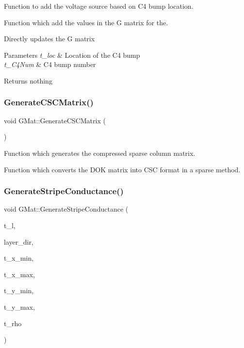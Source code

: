 Function to add the voltage source based on C4 bump location. 

Function which add the values in the G matrix for the.

Directly updates the G matrix 
\begin{DoxyParams}{Parameters}
{\em t\+\_\+loc} & Location of the C4 bump \\
\hline
{\em t\+\_\+\+C4\+Num} & C4 bump number \\
\hline
\end{DoxyParams}
\begin{DoxyReturn}{Returns}
nothing 
\end{DoxyReturn}
\mbox{\label{classGMat_acc6b68783732ff34b6dd4098cb738836}} 
\subsubsection{\texorpdfstring{Generate\+C\+S\+C\+Matrix()}{GenerateCSCMatrix()}}
{\footnotesize\ttfamily void G\+Mat\+::\+Generate\+C\+S\+C\+Matrix (\begin{DoxyParamCaption}{ }\end{DoxyParamCaption})}



Function which generates the compressed sparse column matrix. 

Function which converts the D\+OK matrix into C\+SC format in a sparse method. \mbox{\label{classGMat_a0d8697945b060deaaf4bbd3a444aab6f}} 
\subsubsection{\texorpdfstring{Generate\+Stripe\+Conductance()}{GenerateStripeConductance()}}
{\footnotesize\ttfamily void G\+Mat\+::\+Generate\+Stripe\+Conductance (\begin{DoxyParamCaption}\item[{int}]{t\+\_\+l,  }\item[{odb\+::db\+Tech\+Layer\+Dir\+::\+Value}]{layer\+\_\+dir,  }\item[{int}]{t\+\_\+x\+\_\+min,  }\item[{int}]{t\+\_\+x\+\_\+max,  }\item[{int}]{t\+\_\+y\+\_\+min,  }\item[{int}]{t\+\_\+y\+\_\+max,  }\item[{double}]{t\+\_\+rho }\end{DoxyParamCaption})}



